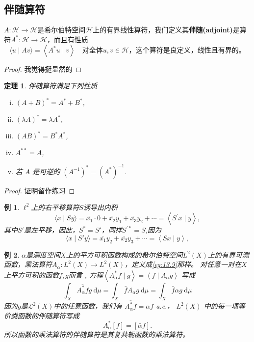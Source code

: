 \documentclass[hyperref,UTF8]{ctexbook}
\newtheorem{eg}{例}[chapter]
\newtheorem{theorem}{定理}[chapter]
\begin{document}
\subsection{伴随算符}
\(A:\mathcal{H}\rightarrow\mathcal{H}\)是希尔伯特空间\(\mathcal{H}\)上的有界线性算符，我们定义其\textbf{伴随(adjoint)}是算符\(A^*:\mathcal{H}\rightarrow\mathcal{H}\)，而且有性质
\begin{equation}
    \langle u \mid A v\rangle=\left\langle A^{*} u \mid v\right\rangle \quad \text{对全体} u, v \in \mathcal{H}，这个算符是良定义，线性且有界的。
\end{equation}
\begin{proof}
    我觉得挺显然的
\end{proof}
\begin{theorem}
    伴随算符满足下列性质
    \begin{enumerate}[(i).]
        \item $(A+B)^{*}=A^{*}+B^{*}$,
        \item $(\lambda A)^{*}=\bar{\lambda} A^{*}$,
        \item $(A B)^{*}=B^{*} A^{*}$,
        \item $A^{* *}=A$,
        \item 若 $A$ 是可逆的 $\left(A^{-1}\right)^{*}=\left(A^{*}\right)^{-1}$.
    \end{enumerate}
\end{theorem}
\begin{proof}
    证明留作练习
\end{proof}
\begin{eg}
    \(\ell^2\)上的右平移算符\(S\)诱导出内积
$$
\langle x \mid S y\rangle=\overline{x_{1}} \cdot 0+\overline{x_{2}} y_{1}+\overline{x_{3}} y_{2}+\cdots=\left\langle S^{\prime} x \mid y\right\rangle,
$$
其中\(S'\)是左平移，因此，\(S^{*}=S'\)，同样\(S^{'*}=S\),因为
$$
\langle x \mid S' y\rangle=\overline{x_{1}} y_2+\overline{x_{2}} y_{3}+\cdots=\left\langle S x \mid y\right\rangle,
$$
\end{eg}
\begin{eg}
    \(\alpha\)是测度空间\(X\)上的平方可积函数构成的希尔伯特空间\(L^2(X)\)上的有界可测函数，乘法算符\(A_\alpha:L^2(X)\rightarrow L^2(X)\)，定义成\ref{eg:13.9}那样。 对任意一对在$X$上平方可积的函数$f, g$而言 , 方程$\left\langle A_{\alpha}^{*} f \mid g\right\rangle=\left\langle f \mid A_{\alpha} g\right\rangle$ 写成
$$
\int_{X} \overline{A_{\alpha}^{*} f} g \mathrm{~d} \mu=\int_{X} \bar{f} A_{\alpha} g \mathrm{~d} \mu=\int_{X} \bar{f} \alpha g \mathrm{~d} \mu
$$
因为$g$是$\mathcal{L}^{2}(X)$中的任意函数，我们有 $\overline{A_{\alpha}^{*} f}=\alpha \bar{f}$ a.e.， $L^{2}(X)$ 中的每一项等价类函数的伴随算符写成
$$
A_{\alpha}^{*}[f]=[\bar{\alpha} f] .
$$
所以函数的乘法算符的伴随算符是其复共轭函数的乘法算符。
\end{eg}
\end{document}
